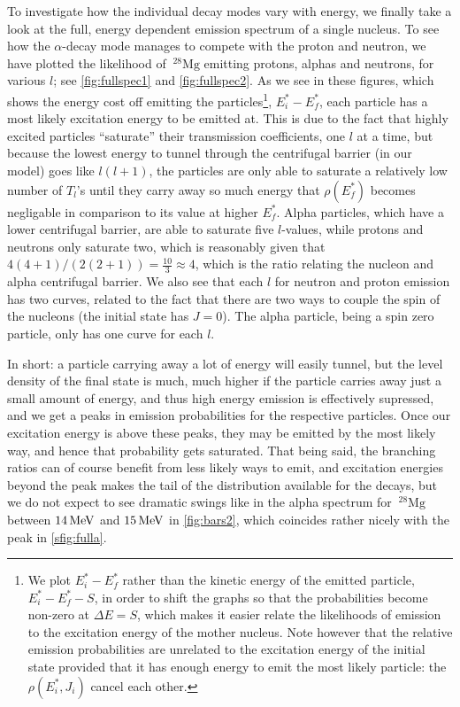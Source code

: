To investigate how the individual decay modes vary with energy, we finally take a look at the full, energy dependent emission spectrum of a single nucleus.
To see how the $\alpha$-decay mode manages to compete with the proton and neutron, we have plotted the likelihood of $~^{28}\mathrm{Mg}$ emitting protons, alphas and neutrons, for various $l$; see \autoref{fig:fullspec1} and \autoref{fig:fullspec2}. As we see in these figures, which shows the energy cost off emitting the particles\footnote{We plot $E_i^*-E_f^*$ rather than the kinetic energy of the emitted particle, $E_i^*-E_f^*-S$, in order to shift the graphs so that the probabilities become non-zero at $\Delta E = S$, which makes it easier relate the likelihoods of emission to the excitation energy of the mother nucleus. Note however that the relative emission probabilities are unrelated to the excitation energy of the initial state provided that it has enough energy to emit the most likely particle: the $\rho(E_i^*,J_i)$ cancel each other.}, $E_i^*-E_f^*$, each particle has a most likely excitation energy to be emitted at. This is due to the fact that highly excited particles ``saturate'' their transmission coefficients, one $l$ at a time, but because the lowest energy to tunnel through the centrifugal barrier (in our model) goes like $l(l+1)$, the particles are only able to saturate a relatively low number of $T_l$'s until they carry away so much energy that $\rho(E_f^*)$ becomes negligable in comparison to its value at higher $E_f^*$. 
Alpha particles, which have a lower centrifugal barrier, are able to saturate five $l$-values, while protons and neutrons only saturate two, which is reasonably given that $4(4+1)/(2(2+1)) = \frac{10}{3} \approx 4$, which is the ratio relating the nucleon and alpha centrifugal barrier. 
We also see that each $l$ for neutron and proton emission has two curves, related to the fact that there are two ways to couple the spin of the nucleons (the initial state has $J=0$). The alpha particle, being a spin zero particle, only has one curve for each $l$.

In short: a particle carrying away a lot of energy will easily tunnel, but the level density of the final state is much, much higher if the particle carries away just a small amount of energy, and thus high energy emission is effectively supressed, and we get a peaks in emission probabilities for the respective particles. Once our excitation energy is above these peaks, they may be emitted by the most likely way, and hence that probability gets saturated. That being said, the branching ratios can of course benefit from less likely ways to emit, and excitation energies beyond the peak makes the tail of the distribution available for the decays, but we do not expect to see dramatic swings like in the alpha spectrum for $~^{28}\mathrm{Mg}$ between $\unit[14]{MeV}$ and $\unit[15]{MeV}$ in \autoref{fig:bars2}, which coincides rather nicely with the peak in \autoref{sfig:fulla}.

